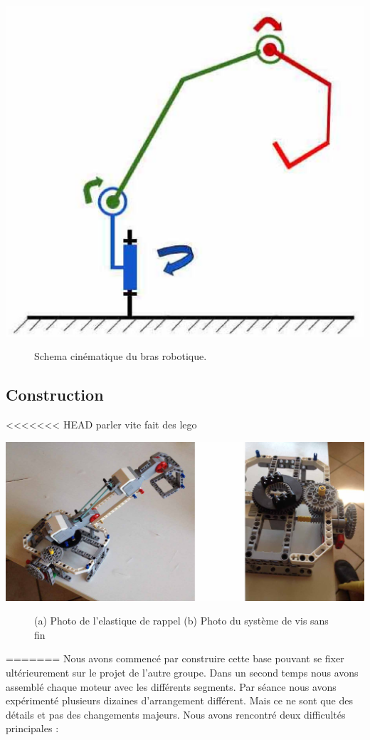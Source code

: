 \documentclass[twoside,twocolumn, 16pt]{article}
\begin{document}
\begin{center}
\includegraphics[scale = 0.3]{cin.eps}
\begin{figure}[!h]
\caption{Schema cinématique du bras robotique.}
\end{figure}
\end{center}

\subsection{Construction}
<<<<<<< HEAD
parler vite fait des lego \\
\begin{center}
\includegraphics[scale = 0.13]{construc.eps}
\begin{figure}[!h]
\caption{(a) Photo de l'elastique de rappel 	(b) Photo du système de vis sans fin}
\end{figure}
\end{center}
=======
Nous avons commencé par construire cette base pouvant se fixer ultérieurement sur le projet de l’autre groupe. 
Dans un second temps nous avons assemblé chaque moteur avec les différents segments. 
Par séance nous avons expérimenté plusieurs dizaines d’arrangement différent. Mais ce ne sont que des détails et pas des changements majeurs.
Nous avons rencontré deux difficultés principales :
\end{document}
